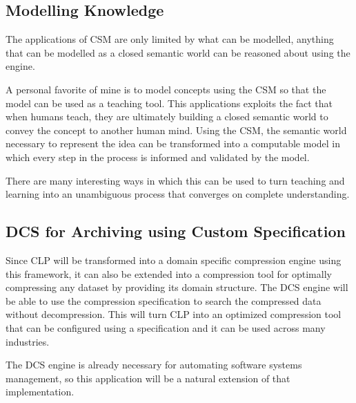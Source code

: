 \subsection{Modelling Knowledge}

The applications of CSM are only limited by what can be modelled, anything that can be modelled as a closed semantic world can be reasoned about using the engine. 

A personal favorite of mine is to model concepts using the CSM so that the model can be used as a teaching tool. This applications exploits the fact that when humans teach, they are ultimately building a closed semantic world to convey the concept to another human mind. Using the CSM, the semantic world necessary to represent the idea can be transformed into a computable model in which every step in the process is informed and validated by the model. 

There are many interesting ways in which this can be used to turn teaching and learning into an unambiguous process that converges on complete understanding.

\subsection{DCS for Archiving using Custom Specification}

Since CLP will be transformed into a domain specific compression engine using this framework, it can also be extended into a compression tool for optimally compressing any dataset by providing its domain structure. The DCS engine will be able to use the compression specification to search the compressed data without decompression. This will turn CLP into an optimized compression tool that can be configured using a specification and it can be used across many industries.

The DCS engine is already necessary for automating software systems management, so this application will be a natural extension of that implementation.